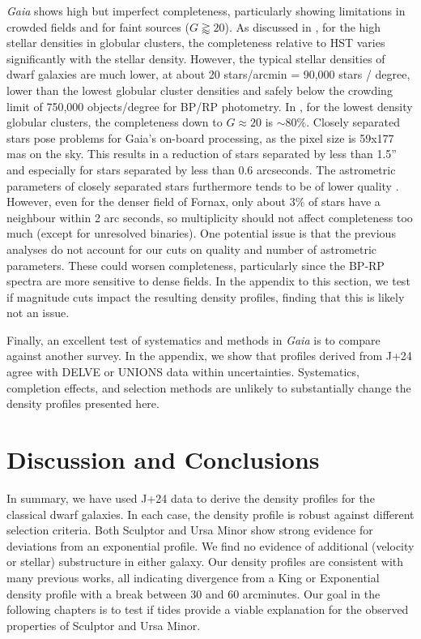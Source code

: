 \emph{Gaia} shows high but imperfect completeness, particularly showing
limitations in crowded fields and for faint sources (\(G\gtrapprox20\)).
As discussed in \citet{fabricius+2021}, for the high stellar densities
in globular clusters, the completeness relative to HST varies
significantly with the stellar density. However, the typical stellar
densities of dwarf galaxies are much lower, at about 20 stars/arcmin =
90,000 stars / degree, lower than the lowest globular cluster densities
and safely below the crowding limit of 750,000 objects/degree for BP/RP
photometry. In \citet{fabricius+2021}, for the lowest density globular
clusters, the completeness down to \(G\approx 20\) is \(\sim 80\%\).
Closely separated stars pose problems for Gaia's on-board processing, as
the pixel size is 59x177 mas on the sky. This results in a reduction of
stars separated by less than 1.5'' and especially for stars separated by
less than 0.6 arcseconds. The astrometric parameters of closely
separated stars furthermore tends to be of lower quality
\citep{fabricius+2021}. However, even for the denser field of Fornax,
only about 3\% of stars have a neighbour within 2 arc seconds, so
multiplicity should not affect completeness too much (except for
unresolved binaries). One potential issue is that the previous analyses
do not account for our cuts on quality and number of astrometric
parameters. These could worsen completeness, particularly since the
BP-RP spectra are more sensitive to dense fields. In the appendix to
this section, we test if magnitude cuts impact the resulting density
profiles, finding that this is likely not an issue.

Finally, an excellent test of systematics and methods in \emph{Gaia} is
to compare against another survey. In the appendix, we show that
profiles derived from J+24 agree with DELVE or UNIONS data within
uncertainties. Systematics, completion effects, and selection methods
are unlikely to substantially change the density profiles presented
here.

\section{Discussion and Conclusions}\label{discussion-and-conclusions}

In summary, we have used J+24 data to derive the density profiles for
the classical dwarf galaxies. In each case, the density profile is
robust against different selection criteria. Both Sculptor and Ursa
Minor show strong evidence for deviations from an exponential profile.
We find no evidence of additional (velocity or stellar) substructure in
either galaxy. Our density profiles are consistent with many previous
works, all indicating divergence from a King or Exponential density
profile with a break between 30 and 60 arcminutes. Our goal in the
following chapters is to test if tides provide a viable explanation for
the observed properties of Sculptor and Ursa Minor.

